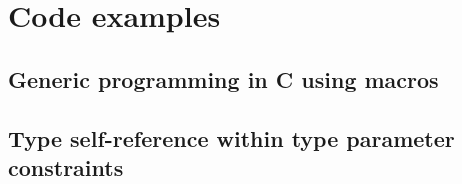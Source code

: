 \section{Code examples}

\subsection{Generic programming in C using macros}
\label{sec:generic-c}




\subsection{Type self-reference within type parameter constraints}
\label{sec:self-ref-type-in-bound}

%
%
